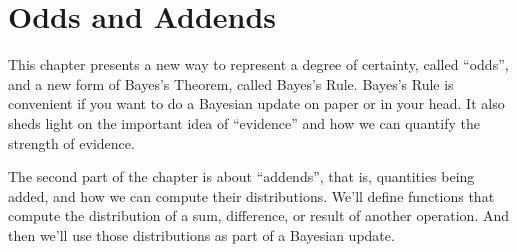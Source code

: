 \documentclass[12pt]{book}
\theoremstyle{exercise}
\newtheorem{exercise}{Exercise}[chapter]
\begin{document}
%
%
%
%
%
%
%
%
%
%
%




\chapter{Odds and Addends}


This chapter presents a new way to represent a degree of certainty, called ``odds'', and a new form of Bayes's Theorem, called Bayes's Rule.
Bayes's Rule is convenient if you want to do a Bayesian update on paper or in your head.
It also sheds light on the important idea of ``evidence'' and how we can quantify the strength of evidence.

The second part of the chapter is about ``addends'', that is, quantities being added, and how we can compute their distributions.
We'll define functions that compute the distribution of a sum, difference, or result of another operation.
And then we'll use those distributions as part of a Bayesian update.
\end{document}
